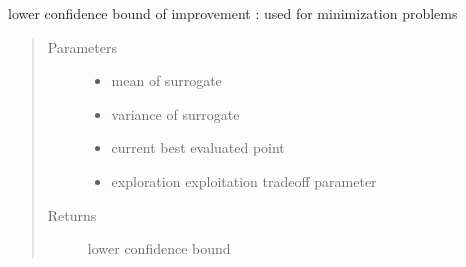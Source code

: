 \documentclass[letterpaper,12pt,english]{sphinxmanual}
\begin{document}
\begin{fulllineitems}
\label{\detokenize{PARyOpt:PARyOpt.acquisition_functions.lower_confidence_bound}}
\sphinxAtStartPar
lower confidence bound of improvement : used for minimization problems
\begin{quote}\begin{description}
\item[{Parameters}] \leavevmode\begin{itemize}
\item {} 
\sphinxAtStartPar
{} \textendash{} mean of surrogate

\item {} 
\sphinxAtStartPar
{} \textendash{} variance of surrogate

\item {} 
\sphinxAtStartPar
{} \textendash{} current best evaluated point

\item {} 
\sphinxAtStartPar
{} \textendash{} exploration \sphinxhyphen{} exploitation tradeoff parameter

\end{itemize}

\item[{Returns}] \leavevmode
\sphinxAtStartPar
lower confidence bound

\end{description}\end{quote}

\end{fulllineitems}

\end{document}
